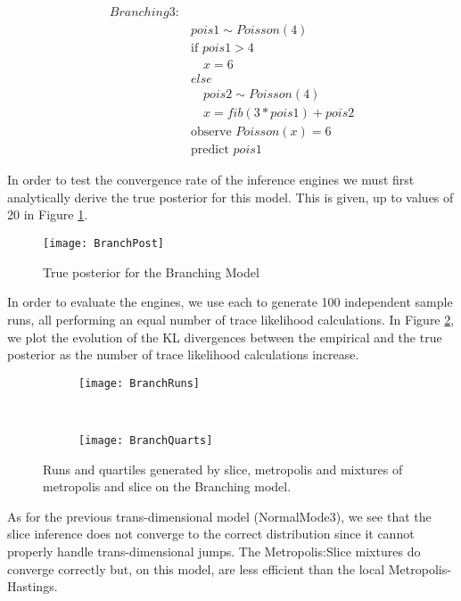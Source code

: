 \begin{align*}
  Branching3:
  \\& pois1 \sim Poisson(4)
  \\&\text{if }pois1 > 4
  \\&\quad x = 6
  \\&else
  \\&\quad pois2 \sim Poisson(4)
  \\&\quad x = fib(3 * pois1) + pois2 \tag{$fib$ is the fibonacci function}
  \\&\text{observe }Poisson(x) = 6
  \\&\text{predict }pois1
\end{align*}

In order to test the convergence rate of the inference engines we must first analytically derive the true posterior for this model. This is given, up to values of 20 in Figure \ref{fig:BranchPost}.

\begin{figure}[h]
    \centering
    \texttt{[image: BranchPost]}
    \caption{True posterior for the Branching Model}
    \label{fig:BranchPost}
\end{figure}

In order to evaluate the engines, we use each to generate 100 independent sample runs, all performing an equal number of trace likelihood calculations. In Figure \ref{fig:branchPerf}, we plot the evolution of the KL divergences between the empirical and the true posterior as the number of trace likelihood calculations increase.

\begin{figure}[h]
        \centering
        \begin{subfigure}[b]{0.48\textwidth}
                \centering
                \texttt{[image: BranchRuns]}
        \end{subfigure}
        ~ 
        \begin{subfigure}[b]{0.48\textwidth}
                \centering
                \texttt{[image: BranchQuarts]}
        \end{subfigure}
    \caption{Runs and quartiles generated by slice, metropolis and mixtures of metropolis and slice on the Branching model.}
    \label{fig:branchPerf}
\end{figure}

As for the previous trans-dimensional model (NormalMode3), we see that the slice inference does not converge to the correct distribution since it cannot properly handle trans-dimensional jumps. The Metropolis:Slice mixtures do converge correctly but, on this model, are less efficient than the local Metropolis-Hastings.

